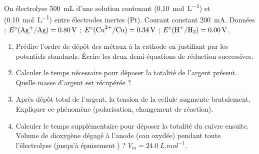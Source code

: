 \documentclass[11pt]{article}
\begin{document}
\begin{exercice}
On électrolyse \SI{500}{mL} d'une solution contenant  (\SI{0,10}{mol.L^{-1}}) et  (\SI{0,10}{mol.L^{-1}}) entre électrodes inertes (Pt). Courant constant \SI{200}{mA}.
Données : $E^\circ(\ce{Ag+/Ag}) = \SI{+0,80}{V}$ ; $E^\circ(\ce{Cu^{2+}/Cu}) = \SI{+0,34}{V}$ ; $E^\circ(\ce{H+/H2}) = \SI{0,00}{V}$.
\begin{enumerate}
    \item Prédire l'ordre de dépôt des métaux à la cathode en justifiant par les potentiels standards. Écrire les deux demi-équations de réduction successives.
    \item Calculer le temps nécessaire pour déposer la totalité de l'argent présent. Quelle masse d'argent est récupérée ?
    \item Après dépôt total de l'argent, la tension de la cellule augmente brutalement. Expliquer ce phénomène (polarisation, changement de réaction).
    \item Calculer le temps supplémentaire pour déposer la totalité du cuivre ensuite. Volume de dioxygène dégagé à l'anode (eau oxydée) pendant toute l'électrolyse (jusqu'à épuisement ) ? $V_m = \SI{24,0}{L.mol^{-1}}$.
\end{enumerate}
\end{exercice}
\end{document}
